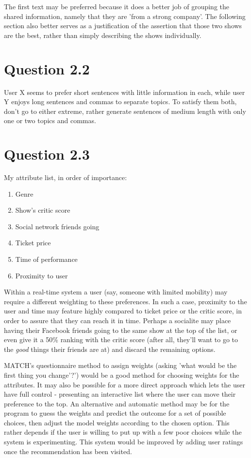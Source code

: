\documentclass[a4paper,11pt,oneside]{article}
\begin{document}
The first text may be preferred because it does a better job of grouping the shared information, namely that they are 'from a strong company'. The following section also better serves as a justification of the assertion that those two shows are the best, rather than simply describing the shows individually.

\section{Question 2.2}
User X seems to prefer short sentences with little information in each, while user Y enjoys long sentences and commas to separate topics. To satisfy them both, don't go to either extreme, rather generate sentences of medium length with only one or two topics and commas.

\section{Question 2.3}
My attribute list, in order of importance:
\begin{enumerate}
\item Genre
\item Show's critic score
\item Social network friends going
\item Ticket price
\item Time of performance
\item Proximity to user
\end{enumerate}

Within a real-time system a user (say, someone with limited mobility) may require a different weighting to these preferences. In such a case, proximity to the user and time may feature highly compared to ticket price or the critic score, in order to assure that they can reach it in time. Perhaps a socialite may place having their Facebook friends going to the same show at the top of the list, or even give it a 50\% ranking with the critic score (after all, they'll want to go to the \emph{good} things their friends are at) and discard the remaining options.

MATCH's questionnaire method to assign weights (asking 'what would be the first thing you change'?') would be a good method for choosing weights for the attributes. It may also be possible for a more direct approach which lets the user have full control - presenting an interactive list where the user can move their preference to the top. An alternative and automatic method may be for the program to guess the weights and predict the outcome for a set of possible choices, then adjust the model weights according to the chosen option. This rather depends if the user is willing to put up with a few poor choices while the system is experimenting. This system would be improved by adding user ratings once the recommendation has been visited.
\end{document}
